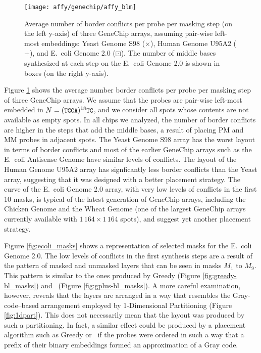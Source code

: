 \begin{figure}[t]\centering
\texttt{[image: affy/genechip/affy\_blm]}
\caption{\label{fig:affy_blm}%
  Average number of border conflicts per probe per masking step (on the left
  y-axis) of three GeneChip arrays, assuming pair-wise left-most embeddings:
  Yeast Genome S98 ({\scriptsize $\times$}), Human Genome U95A2 ({\tiny $+$}),
  and E.\ coli Genome 2.0 ({\tiny $\boxdot$}). The number of middle bases
  synthesized at each step on the E.\ coli Genome 2.0 is shown in boxes (on the
  right y-axis).}
\end{figure}

Figure \ref{fig:affy_blm} shows the average number border conflicts per probe
per masking step of three GeneChip arrays. We assume that the probes are
pair-wise left-most embedded in $N=({\text{\small{\tt{TGCA}}}})^{18}{\text{\small{\tt{TG}}}}$, and we consider
all spots whose contents are not available as empty spots. In all chips we
analyzed, the number of border conflicts are higher in the steps that add the
middle bases, a result of placing PM and MM probes in adjacent spots. The Yeast
Genome S98 array has the worst layout in terms of border conflicts and most of
the earlier GeneChip arrays such as the E.\ coli Antisense Genome have similar
levels of conflicts. The layout of the Human Genome U95A2 array has signficantly
less border conflicts than the Yeast array, suggesting that it was designed with
a better placement strategy. The curve of the E.\ coli Genome 2.0 array, with
very low levels of conflicts in the first 10 masks, is typical of the latest
generation of GeneChip arrays, including the Chicken Genome and the Wheat Genome
(one of the largest GeneChip arrays currently available with
$1\,164\times 1\,164$ spots), and suggest yet another placement strategy.

Figure \ref{fig:ecoli_masks} shows a representation of selected masks for the
E.\ coli Genome 2.0. The low levels of conflicts in the first synthesis steps
are a result of the pattern of masked and unmasked layers that can be seen in
masks $M_1$ to $M_9$. This pattern is similar to the ones produced by Greedy
(Figure \ref{fig:greedy-bl_masks}) and \Greedyplus\ (Figure
\ref{fig:gplus-bl_masks}). A more careful examination, however, reveals that the
layers are arranged in a way that resembles the Gray-code--based arrangement
employed by 1-Dimensional Partitioning (Figure \ref{fig:1dpart}). This does not
necessarily mean that the layout was produced by such a partitioning. In fact, a
similar effect could be produced by a placement algorithm such as Greedy or
\Greedyplus\ if the probes were ordered in such a way that a prefix of their
binary embeddings formed an approximation of a Gray code.

